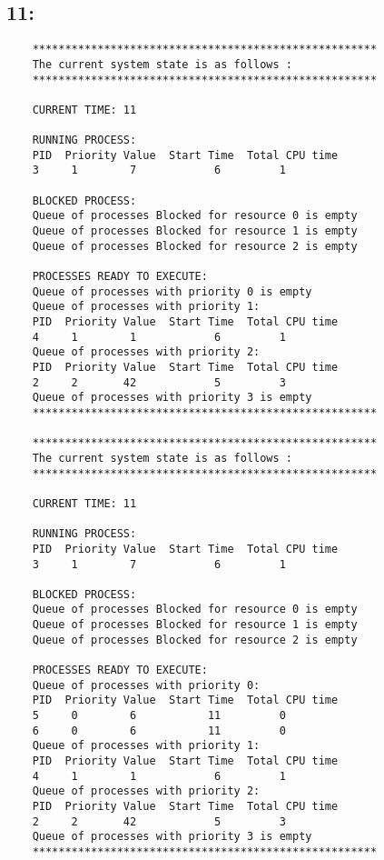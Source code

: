 \documentclass{article}
\begin{document}
\subsection*{11:}
\begin{verbatim}
    *****************************************************
    The current system state is as follows : 
    *****************************************************
    
    CURRENT TIME: 11

    RUNNING PROCESS:
    PID  Priority Value  Start Time  Total CPU time
    3     1        7            6         1

    BLOCKED PROCESS:
    Queue of processes Blocked for resource 0 is empty
    Queue of processes Blocked for resource 1 is empty
    Queue of processes Blocked for resource 2 is empty

    PROCESSES READY TO EXECUTE:
    Queue of processes with priority 0 is empty
    Queue of processes with priority 1:
    PID  Priority Value  Start Time  Total CPU time
    4     1        1            6         1
    Queue of processes with priority 2:
    PID  Priority Value  Start Time  Total CPU time
    2     2       42            5         3
    Queue of processes with priority 3 is empty
    *****************************************************

    *****************************************************
    The current system state is as follows : 
    *****************************************************
    
    CURRENT TIME: 11

    RUNNING PROCESS:
    PID  Priority Value  Start Time  Total CPU time
    3     1        7            6         1

    BLOCKED PROCESS:
    Queue of processes Blocked for resource 0 is empty
    Queue of processes Blocked for resource 1 is empty
    Queue of processes Blocked for resource 2 is empty

    PROCESSES READY TO EXECUTE:
    Queue of processes with priority 0:
    PID  Priority Value  Start Time  Total CPU time
    5     0        6           11         0
    6     0        6           11         0
    Queue of processes with priority 1:
    PID  Priority Value  Start Time  Total CPU time
    4     1        1            6         1
    Queue of processes with priority 2:
    PID  Priority Value  Start Time  Total CPU time
    2     2       42            5         3
    Queue of processes with priority 3 is empty
    *****************************************************


\end{verbatim}
\end{document}
